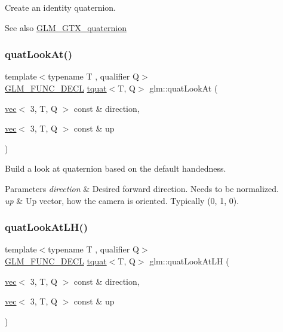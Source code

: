 Create an identity quaternion.

\begin{DoxySeeAlso}{See also}
\hyperlink{group__gtx__quaternion}{G\+L\+M\+\_\+\+G\+T\+X\+\_\+quaternion} 
\end{DoxySeeAlso}
\mbox{\label{group__gtx__quaternion_ga668d9ec9964ced2b455d416677e1e8b9}} 
\subsubsection{\texorpdfstring{quat\+Look\+At()}{quatLookAt()}}
{\footnotesize\ttfamily template$<$typename T , qualifier Q$>$ \\
\hyperlink{setup_8hpp_ab2d052de21a70539923e9bcbf6e83a51}{G\+L\+M\+\_\+\+F\+U\+N\+C\+\_\+\+D\+E\+CL} \hyperlink{structglm_1_1tquat}{tquat}$<$T, Q$>$ glm\+::quat\+Look\+At (\begin{DoxyParamCaption}\item[{\hyperlink{structglm_1_1vec}{vec}$<$ 3, T, Q $>$ const \&}]{direction,  }\item[{\hyperlink{structglm_1_1vec}{vec}$<$ 3, T, Q $>$ const \&}]{up }\end{DoxyParamCaption})}

Build a look at quaternion based on the default handedness.


\begin{DoxyParams}{Parameters}
{\em direction} & Desired forward direction. Needs to be normalized. \\
\hline
{\em up} & Up vector, how the camera is oriented. Typically (0, 1, 0). \\
\hline
\end{DoxyParams}
\mbox{\label{group__gtx__quaternion_ga6f1b3fba52fcab952d0ab523177ff443}} 
\subsubsection{\texorpdfstring{quat\+Look\+At\+L\+H()}{quatLookAtLH()}}
{\footnotesize\ttfamily template$<$typename T , qualifier Q$>$ \\
\hyperlink{setup_8hpp_ab2d052de21a70539923e9bcbf6e83a51}{G\+L\+M\+\_\+\+F\+U\+N\+C\+\_\+\+D\+E\+CL} \hyperlink{structglm_1_1tquat}{tquat}$<$T, Q$>$ glm\+::quat\+Look\+At\+LH (\begin{DoxyParamCaption}\item[{\hyperlink{structglm_1_1vec}{vec}$<$ 3, T, Q $>$ const \&}]{direction,  }\item[{\hyperlink{structglm_1_1vec}{vec}$<$ 3, T, Q $>$ const \&}]{up }\end{DoxyParamCaption})}

